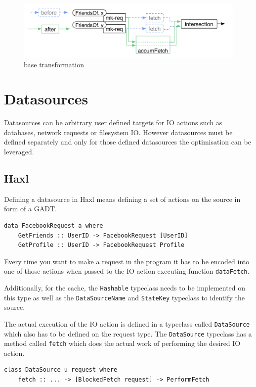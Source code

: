 \begin{figure}
	\includegraphics[width=\textwidth]{Figures/yauhau-transformation}
	\caption{base transformation}
	\label{figure:yauhau-transformation}
\end{figure}

\section{Datasources}

Datasources can be arbitrary user defined targets for IO actions such as databases, network requests or filesystem IO.
However datasources must be defined separately and only for those defined datasources the optimisation can be leveraged.

\subsection{Haxl}

Defining a datasource in Haxl means defining a set of actions on the source in form of a GADT.

\begin{verbatim}
data FacebookRequest a where
    GetFriends :: UserID -> FacebookRequest [UserID]
    GetProfile :: UserID -> FacebookRequest Profile
\end{verbatim}

Every time you want to make a request in the program it has to be encoded into one of those actions when passed to the IO action executing function \texttt{dataFetch}.

Additionally, for the cache, the \texttt{Hashable} typeclass needs to be implemented on this type as well as the \texttt{DataSourceName} and \texttt{StateKey} typeclass to identify the source.

The actual execution of the IO action is defined in a typeclass called \texttt{DataSource} which also has to be defined on the request type.
The \texttt{DataSource} typeclass has a method called \texttt{fetch} which does the actual work of performing the desired IO action.

\begin{verbatim}
class DataSource u request where
    fetch :: ... -> [BlockedFetch request] -> PerformFetch
\end{verbatim}


